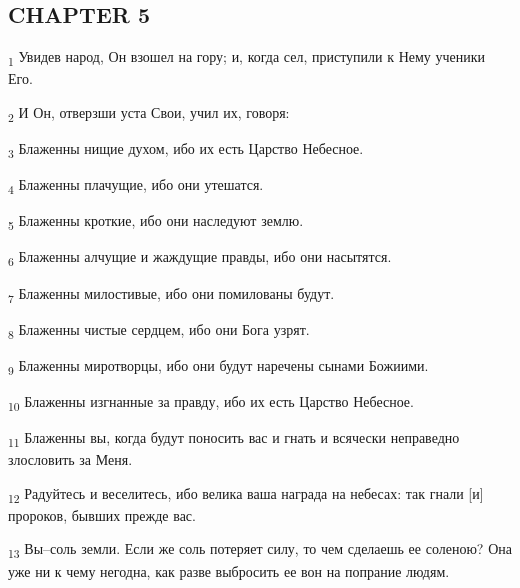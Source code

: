 \subsection{CHAPTER 5}
\begin{tcolorbox}
\textsubscript{1} Увидев народ, Он взошел на гору; и, когда сел, приступили к Нему ученики Его.
\end{tcolorbox}
\begin{tcolorbox}
\textsubscript{2} И Он, отверзши уста Свои, учил их, говоря:
\end{tcolorbox}
\begin{tcolorbox}
\textsubscript{3} Блаженны нищие духом, ибо их есть Царство Небесное.
\end{tcolorbox}
\begin{tcolorbox}
\textsubscript{4} Блаженны плачущие, ибо они утешатся.
\end{tcolorbox}
\begin{tcolorbox}
\textsubscript{5} Блаженны кроткие, ибо они наследуют землю.
\end{tcolorbox}
\begin{tcolorbox}
\textsubscript{6} Блаженны алчущие и жаждущие правды, ибо они насытятся.
\end{tcolorbox}
\begin{tcolorbox}
\textsubscript{7} Блаженны милостивые, ибо они помилованы будут.
\end{tcolorbox}
\begin{tcolorbox}
\textsubscript{8} Блаженны чистые сердцем, ибо они Бога узрят.
\end{tcolorbox}
\begin{tcolorbox}
\textsubscript{9} Блаженны миротворцы, ибо они будут наречены сынами Божиими.
\end{tcolorbox}
\begin{tcolorbox}
\textsubscript{10} Блаженны изгнанные за правду, ибо их есть Царство Небесное.
\end{tcolorbox}
\begin{tcolorbox}
\textsubscript{11} Блаженны вы, когда будут поносить вас и гнать и всячески неправедно злословить за Меня.
\end{tcolorbox}
\begin{tcolorbox}
\textsubscript{12} Радуйтесь и веселитесь, ибо велика ваша награда на небесах: так гнали [и] пророков, бывших прежде вас.
\end{tcolorbox}
\begin{tcolorbox}
\textsubscript{13} Вы--соль земли. Если же соль потеряет силу, то чем сделаешь ее соленою? Она уже ни к чему негодна, как разве выбросить ее вон на попрание людям.
\end{tcolorbox}
